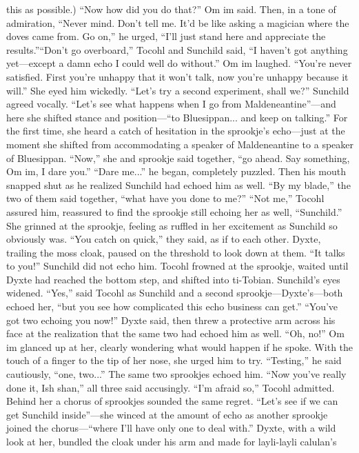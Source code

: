 \documentclass[9pt]{article}
\begin{document}
this as possible.)
“Now how did you do that?” Om im said. Then, in a tone of admiration, “Never mind. Don’t tell me.
It’d be like asking a magician where the doves came from. Go on,” he urged, “I’ll just stand here and
appreciate the results.”“Don’t go overboard,” Tocohl and Sunchild said, “I haven’t got anything yet—except a damn echo
I could well do without.”
Om im laughed. “You’re never satisfied. First you’re unhappy that it won’t talk, now you’re unhappy
because it will.”
She eyed him wickedly. “Let’s try a second experiment, shall we?” Sunchild agreed vocally. “Let’s
see what happens when I go from Maldeneantine”—and here she shifted stance and position—“to
Bluesippan... and keep on talking.”
For the first time, she heard a catch of hesitation in the sprookje’s echo—just at the moment she
shifted from accommodating a speaker of Maldeneantine to a speaker of Bluesippan. “Now,” she and
sprookje said together, “go ahead. Say something, Om im, I dare you.”
“Dare me...” he began, completely puzzled. Then his mouth snapped shut as he realized Sunchild
had echoed him as well. “By my blade,” the two of them said together, “what have you done to me?”
“Not me,” Tocohl assured him, reassured to find the sprookje still echoing her as well, “Sunchild.”
She grinned at the sprookje, feeling as ruffled in her excitement as Sunchild so obviously was. “You catch
on quick,” they said, as if to each other.
Dyxte, trailing the moss cloak, paused on the threshold to look down at them. “It talks to you!”
Sunchild did not echo him. Tocohl frowned at the sprookje, waited until Dyxte had reached the
bottom step, and shifted into ti-Tobian. Sunchild’s eyes widened. “Yes,” said Tocohl as Sunchild and a
second sprookje—Dyxte’s—both echoed her, “but you see how complicated this echo business can
get.”
“You’ve got two echoing you now!” Dyxte said, then threw a protective arm across his face at the
realization that the same two had echoed him as well. “Oh, no!”
Om im glanced up at her, clearly wondering what would happen if he spoke. With the touch of a
finger to the tip of her nose, she urged him to try. “Testing,” he said cautiously, “one, two...” The same
two sprookjes echoed him. “Now you’ve really done it, Ish shan,” all three said accusingly.
“I’m afraid so,” Tocohl admitted. Behind her a chorus of sprookjes sounded the same regret. “Let’s
see if we can get Sunchild inside”—she winced at the amount of echo as another sprookje joined the
chorus—“where I’ll have only one to deal with.”
Dyxte, with a wild look at her, bundled the cloak under his arm and made for layli-layli calulan’s
\end{document}

